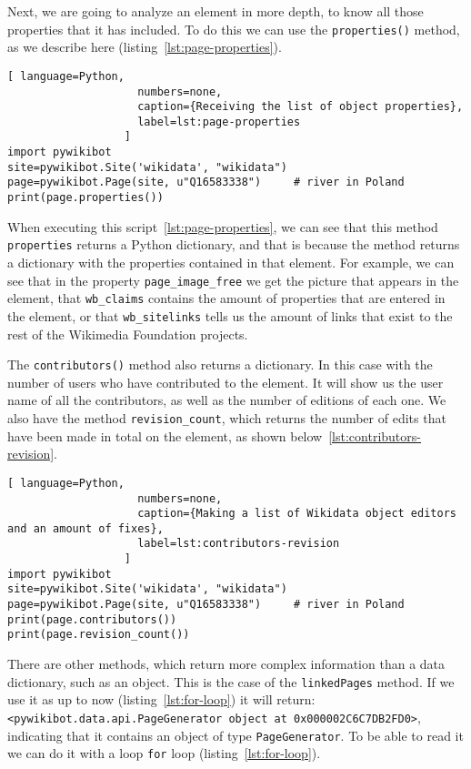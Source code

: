 Next, we are going to analyze an element in more depth, to know all those properties that it has included. To do this we can use the \lstinline|properties()| method, as we describe here (listing~\ref{lst:page-properties}).

\begin{lstlisting}[ language=Python,
                    numbers=none,
                    caption={Receiving the list of object properties},
                    label=lst:page-properties
                  ]
import pywikibot
site=pywikibot.Site('wikidata', "wikidata")
page=pywikibot.Page(site, u"Q16583338")     # river in Poland
print(page.properties())
\end{lstlisting}

When executing this script~\ref{lst:page-properties}, we can see that this method \lstinline|properties| 
returns a Python dictionary, and that is because the method returns a dictionary with the properties contained in that element. 
For example, we can see that in the property \lstinline|page_image_free| we get the picture that appears in the element, that
 \lstinline|wb_claims| contains the amount of properties that are entered in the element, 
or that \lstinline|wb_sitelinks| tells us the amount of links that exist to the rest of the Wikimedia Foundation projects.

The \lstinline|contributors()| method also returns a dictionary. In this case with the number of users who have contributed to the element. 
It will show us the user name of all the contributors, as well as the number of editions of each one.
We also have the method \lstinline|revision_count|, which returns the number of edits that have been made in total on the element, as shown below~\ref{lst:contributors-revision}.

\begin{lstlisting}[ language=Python,
                    numbers=none,
                    caption={Making a list of Wikidata object editors and an amount of fixes},
                    label=lst:contributors-revision
                  ]
import pywikibot
site=pywikibot.Site('wikidata', "wikidata")
page=pywikibot.Page(site, u"Q16583338")     # river in Poland
print(page.contributors())
print(page.revision_count())
\end{lstlisting}

There are other methods, which return more complex information than a data dictionary, such as an object.
This is the case of the \lstinline|linkedPages| method. If we use it as up to now (listing~\ref{lst:for-loop}) it will return: 
\lstinline|<pywikibot.data.api.PageGenerator object at 0x000002C6C7DB2FD0>|, indicating that it contains an object of type \lstinline|PageGenerator|. 
To be able to read it we can do it with a loop \lstinline|for| loop (listing~\ref{lst:for-loop}).

